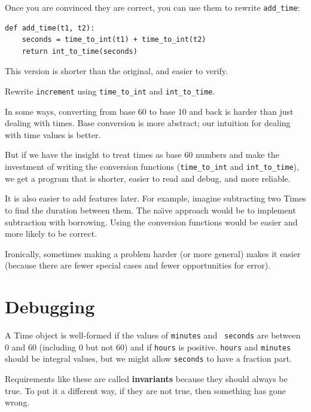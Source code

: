 \documentclass[10pt]{book}
\begin{document}
{

Once you are convinced they are correct, you can use them to 
rewrite \verb"add_time":

\beforeverb
\begin{verbatim}
def add_time(t1, t2):
    seconds = time_to_int(t1) + time_to_int(t2)
    return int_to_time(seconds)
\end{verbatim}
\afterverb
%
This version is shorter than the original, and easier to verify.

\begin{ex}
Rewrite {\tt increment} using \verb"time_to_int" and \verb"int_to_time".
\end{ex}

In some ways, converting from base 60 to base 10 and back is harder
than just dealing with times.  Base conversion is more abstract; our
intuition for dealing with time values is better.

But if we have the insight to treat times as base 60 numbers and make
the investment of writing the conversion functions (\verb"time_to_int"
and \verb"int_to_time"), we get a program that is shorter, easier to
read and debug, and more reliable.

It is also easier to add features later.  For example, imagine
subtracting two Times to find the duration between them.  The
na\"{\i}ve approach would be to implement subtraction with borrowing.
Using the conversion functions would be easier and more likely to be
correct.


Ironically, sometimes making a problem harder (or more general) makes it
easier (because there are fewer special cases and fewer opportunities
for error).


\section{Debugging}

A Time object is well-formed if the values of {\tt minutes} and {\tt
seconds} are between 0 and 60 (including 0 but not 60) and if 
{\tt hours} is positive.  {\tt hours} and {\tt minutes} should be
integral values, but we might allow {\tt seconds} to have a
fraction part.


Requirements like these are called {\bf invariants} because
they should always be true.  To put it a different way, if they
are not true, then something has gone wrong.

}
\end{document}
